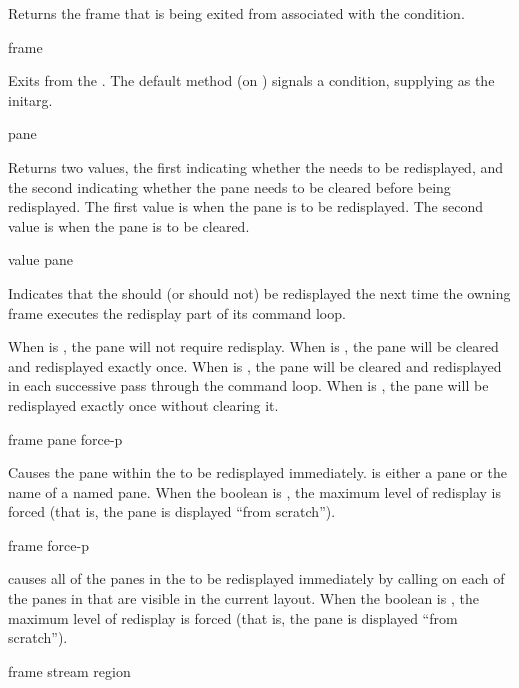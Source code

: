 Returns the frame that is being exited from associated with the 
condition.

 {frame}

Exits from the  .  The default method (on
) signals a  condition, supplying
 as the  initarg.


 {pane}

Returns two values, the first indicating whether the  
needs to be redisplayed, and the second indicating whether the pane needs to be
cleared before being redisplayed.  The first value is  when the pane
is to be redisplayed.  The second value is  when the pane is to be
cleared.

 {value pane}

Indicates that the   should (or should not) be redisplayed
the next time the owning frame executes the redisplay part of its command loop.

When  is , the pane will not require redisplay.  When
 is , the pane will be cleared and redisplayed exactly once.
When  is , the pane will be cleared and redisplayed
in each successive pass through the command loop.  When  is
, the pane will be redisplayed exactly once without clearing it.

 {frame pane \key force-p}

Causes the pane  within the   to be redisplayed
immediately.   is either a pane or the name of a named pane.  When the
boolean  is , the maximum level of redisplay is forced
(that is, the pane is displayed ``from scratch'').

 {frame \key force-p}

 causes all of the panes in the 
 to be redisplayed immediately by calling 
on each of the panes in  that are visible in the current layout.
When the boolean  is , the maximum level of redisplay is
forced (that is, the pane is displayed ``from scratch'').

 {frame stream \optional region} 


